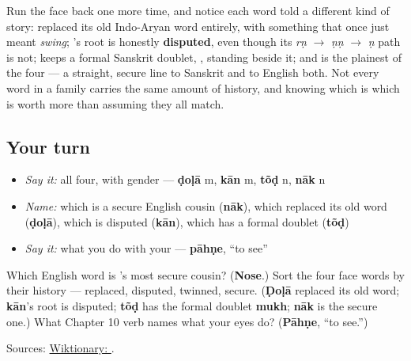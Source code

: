 \begin{culture}
Run the face back one more time, and notice each word told a different kind of story: \textbf{} replaced its old Indo-Aryan word entirely, with something that once just meant \emph{swing}; \textbf{}'s root is honestly \textbf{disputed}, even though its \emph{rṇ} $\to$ \emph{ṇṇ} $\to$ \emph{ṇ} path is not; \textbf{} keeps a formal Sanskrit doublet, \textbf{}, standing beside it; and \textbf{} is the plainest of the four — a straight, secure line to Sanskrit and to English both. Not every word in a family carries the same amount of history, and knowing which is which is worth more than assuming they all match.
\end{culture}

\subsection*{Your turn}
\begin{itemize}
\raggedright
  \item \emph{Say it:} all four, with gender — \textbf{ḍoḷā} m, \textbf{kān} m, \textbf{tõḍ} n, \textbf{nāk} n
  \item \emph{Name:} which is a secure English cousin (\textbf{nāk}), which replaced its old word (\textbf{ḍoḷā}), which is disputed (\textbf{kān}), which has a formal doublet (\textbf{tõḍ})
  \item \emph{Say it:} what you do with your \textbf{} — \textbf{pāhṇe}, \textquotedblleft{}to see\textquotedblright{}
\end{itemize}

\begin{tcolorbox}[breakable,colback=teal!4,colframe=teal!35!black,title={Before you move on}]
Which English word is \textbf{}'s most secure cousin? (\textbf{Nose}.) Sort the four face words by their history — replaced, disputed, twinned, secure. (\textbf{Ḍoḷā} replaced its old word; \textbf{kān}'s root is disputed; \textbf{tõḍ} has the formal doublet \textbf{mukh}; \textbf{nāk} is the secure one.) What Chapter 10 verb names what your eyes do? (\textbf{Pāhṇe}, \textquotedblleft{}to see.\textquotedblright{})

Sources: \href{https://en.wiktionary.org/wiki/\%E0\%A4\%A8\%E0\%A4\%BE\%E0\%A4\%95}{Wiktionary: }.
\end{tcolorbox}
